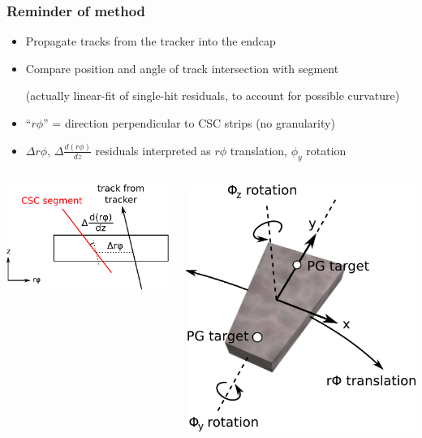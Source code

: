 \documentclass[compress]{beamer}
\begin{document}
\begin{frame}
\frametitle{Reminder of method}

\begin{itemize}
\item Propagate tracks from the tracker into the endcap
\item Compare position and angle of track intersection with segment

{\scriptsize (actually linear-fit of single-hit residuals, to account for possible curvature)}

\item ``$r\phi$'' = direction perpendicular to CSC strips (no granularity)

\item $\Delta r\phi$, $\Delta \frac{d(r\phi)}{dz}$ residuals interpreted as $r\phi$ translation, $\phi_y$ rotation
\end{itemize}

\begin{columns}
\begin{center}
\includegraphics[width=0.7\linewidth]{explanation.pdf}
\end{center}

\includegraphics[width=\linewidth]{csc_coordinates.pdf}
\end{columns}
\end{frame}
\end{document}
